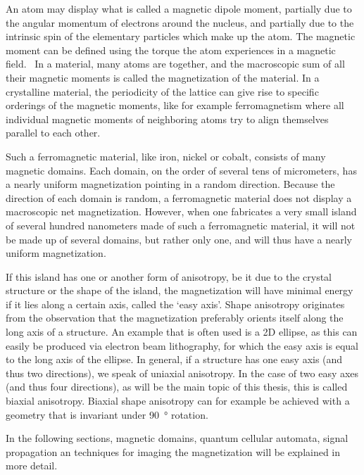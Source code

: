 \documentclass[10pt,a4paper]{article}
\begin{document}
An atom may display what is called a magnetic dipole moment, partially due to the angular momentum of electrons around the nucleus, and partially due to the intrinsic spin of the elementary particles which make up the atom. The magnetic moment can be defined using the torque the atom experiences in a magnetic field.~\cite{IntroMagneticMaterials} In a material, many atoms are together, and the macroscopic sum of all their magnetic moments is called the magnetization of the material. In a crystalline material, the periodicity of the lattice can give rise to specific orderings of the magnetic moments, like for example ferromagnetism where all individual magnetic moments of neighboring atoms try to align themselves parallel to each other. \par 
Such a ferromagnetic material, like iron, nickel or cobalt, consists of many magnetic domains. Each domain, on the order of several tens of micrometers, has a nearly uniform magnetization pointing in a random direction. Because the direction of each domain is random, a ferromagnetic material does not display a macroscopic net magnetization. However, when one fabricates a very small island of several hundred nanometers made of such a ferromagnetic material, it will not be made up of several domains, but rather only one, and will thus have a nearly uniform magnetization. \par
If this island has one or another form of anisotropy, be it due to the crystal structure or the shape of the island, the magnetization will have minimal energy if it lies along a certain axis, called the `easy axis'. Shape anisotropy originates from the observation that the magnetization preferably orients itself along the long axis of a structure. An example that is often used is a 2D ellipse, as this can easily be produced via electron beam lithography, for which the easy axis is equal to the long axis of the ellipse. 
In general, if a structure has one easy axis (and thus two directions), we speak of uniaxial anisotropy. In the case of two easy axes (and thus four directions), as will be the main topic of this thesis, this is called biaxial anisotropy. Biaxial shape anisotropy can for example be achieved with a geometry that is invariant under \SI{90}{\degree} rotation. \par
In the following sections, magnetic domains, quantum cellular automata, signal propagation an techniques for imaging the magnetization will be explained in more detail.
\end{document}
